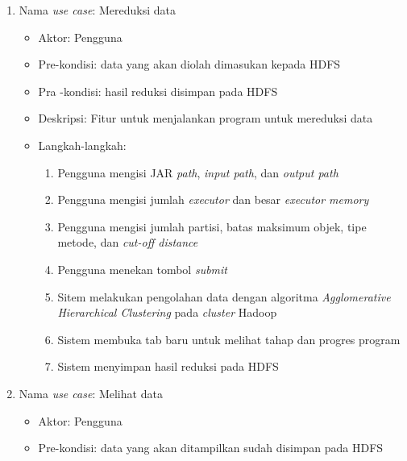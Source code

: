 \begin{enumerate}

\item Nama \textit{use case}: Mereduksi data

\begin{itemize}
\item Aktor: Pengguna

\item Pre-kondisi: data yang akan diolah dimasukan kepada HDFS

\item Pra -kondisi: hasil reduksi disimpan pada HDFS

\item Deskripsi: Fitur untuk menjalankan program untuk mereduksi data

\item Langkah-langkah:

\begin{enumerate}

\item Pengguna mengisi JAR \textit{path}, \textit{input path}, dan \textit{output path}

\item Pengguna mengisi jumlah \textit{executor} dan besar \textit{executor memory}

\item Pengguna mengisi jumlah partisi, batas maksimum objek, tipe metode, dan \textit{cut-off distance} 

\item Pengguna menekan tombol \textit{submit}

\item Sitem melakukan pengolahan data dengan algoritma \textit{Agglomerative Hierarchical Clustering} pada \textit{cluster} Hadoop

\item Sistem membuka tab baru untuk melihat tahap dan progres program

\item Sistem menyimpan hasil reduksi pada HDFS
\end{enumerate}

\end{itemize}


\item Nama \textit{use case}: Melihat data

\begin{itemize}
\item Aktor: Pengguna

\item Pre-kondisi: data yang akan ditampilkan sudah disimpan pada HDFS


\end{itemize}
\end{enumerate}
